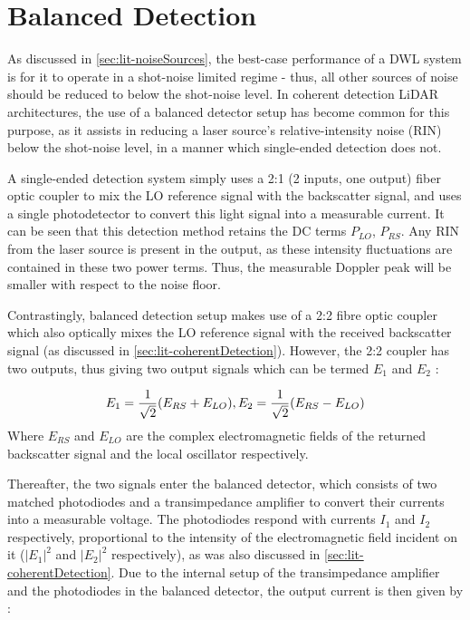 \chapter{Balanced Detection}
\label{appendix:RIN}
As discussed  in \autoref{sec:lit-noiseSources}, the best-case performance of a DWL system is for it to operate in a shot-noise limited regime - thus, all other sources of noise should be reduced to below the shot-noise level. In coherent detection LiDAR architectures, the use of a balanced detector setup has become common for this purpose, as it assists in reducing a laser source's relative-intensity noise (RIN) below the shot-noise level, in a manner which single-ended detection does not.

A single-ended detection system simply uses a 2:1 (2 inputs, one output) fiber optic coupler to mix the LO reference signal with the backscatter signal, and uses a single photodetector to convert this light signal into a measurable current. It can be seen that this detection method retains the DC terms $P_{LO}$, $P_{RS}$. Any RIN from the laser source is present in the output, as these intensity fluctuations are contained in these two power terms. Thus, the measurable Doppler peak will be smaller with respect to the noise floor.

Contrastingly, balanced detection setup makes use of a 2:2 fibre optic coupler which also optically mixes the LO reference signal with the received backscatter signal (as discussed in \autoref{sec:lit-coherentDetection}). However, the 2:2 coupler has two outputs, thus giving two output signals which can be termed $E_1$ and $E_2$ \cite{kikuchi_fundamentals_2016}:

\begin{equation}
	E_1 = \frac{1}{\sqrt2}(E_{RS} + E_{LO}), \space
	E_2 = \frac{1}{\sqrt{2}}(E_{RS} - E_{LO})
\end{equation}
Where $E_{RS}$ and $E_{LO}$ are the complex electromagnetic fields of the returned backscatter signal and the local oscillator respectively.

Thereafter, the two signals enter the balanced detector, which consists of two matched photodiodes and a transimpedance amplifier to convert their currents into a measurable voltage. The photodiodes respond with currents $I_1$ and $I_2$ respectively, proportional to the intensity of the electromagnetic field incident on it ($|E_{1}|^2$ and $|E_2|^2$ respectively), as was also discussed in \autoref{sec:lit-coherentDetection}. Due to the internal setup of the transimpedance amplifier and the photodiodes in the balanced detector, the output current is then given by \cite{kikuchi_fundamentals_2016}:

